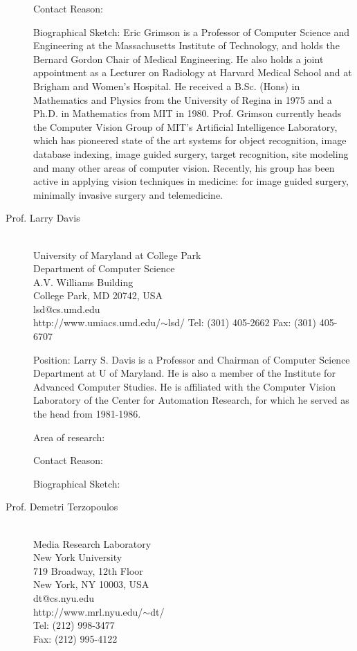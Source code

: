 \documentclass{gtcv}
\begin{document}
\begin{description}
Contact Reason:


\smallskip
Biographical Sketch: Eric Grimson is a Professor of Computer
Science and Engineering at the Massachusetts Institute of
Technology, and holds the Bernard Gordon Chair of Medical
Engineering. He also holds a joint appointment as a Lecturer on
Radiology at Harvard Medical School and at Brigham and Women's
Hospital. He received a B.Sc. (Hons) in Mathematics and Physics
from the University of Regina in 1975 and a Ph.D. in Mathematics
from MIT in 1980. Prof. Grimson currently heads the Computer
Vision Group of MIT's Artificial Intelligence Laboratory, which
has pioneered state of the art systems for object recognition,
image database indexing, image guided surgery, target recognition,
site modeling and many other areas of computer vision. Recently,
his group has been active in applying vision techniques in
medicine: for image guided surgery, minimally invasive surgery and
telemedicine.


\item[Prof. Larry Davis]~\\
University of Maryland at College Park \\
Department of Computer Science\\
A.V. Williams Building \\
College Park, MD 20742, USA\\
lsd@cs.umd.edu\\
http://www.umiacs.umd.edu/$\sim$lsd/
 Tel: (301) 405-2662
 Fax: (301) 405-6707

\medskip
Position: Larry S. Davis is a Professor and Chairman of Computer
Science Department at U of Maryland. He is also a member of the
Institute for Advanced Computer Studies. He is affiliated with the
Computer Vision Laboratory of the Center for Automation Research,
for which he served as the head from 1981-1986.

Area of research:

Contact Reason:

\smallskip
Biographical Sketch:

\item[Prof. Demetri Terzopoulos]~\\
Media Research Laboratory \\
New York University\\
719 Broadway, 12th Floor\\
New York, NY 10003, USA\\
dt@cs.nyu.edu \\
http://www.mrl.nyu.edu/$\sim$dt/ \\
Tel: (212) 998-3477\\
Fax: (212) 995-4122


\end{description}
\end{document}
